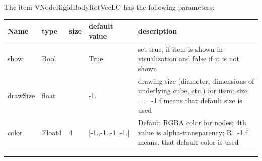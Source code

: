 The item VNodeRigidBodyRotVecLG has the following parameters:\vspace{-1cm}\\ 
\begin{center}
  \footnotesize
  \begin{longtable}{| p{4.5cm} | p{2.5cm} | p{0.5cm} | p{2.5cm} | p{6cm} |}
    \hline
    \bf Name & \bf type & \bf size & \bf default value & \bf description \\ \hline
    show &     Bool &      &     True &     set true, if item is shown in visualization and false if it is not shown\\ \hline
    drawSize &     float &      &     -1. &     drawing size (diameter, dimensions of underlying cube, etc.)  for item; size == -1.f means that default size is used\\ \hline
    color &     Float4 &     4 &     [-1.,-1.,-1.,-1.] &     Default RGBA color for nodes; 4th value is alpha-transparency; R=-1.f means, that default color is used\\ \hline
	  \end{longtable}
	\end{center}
\par\noindent\rule{\textwidth}{0.4pt}
\label{description_NodeRigidBodyRotVecLG}
